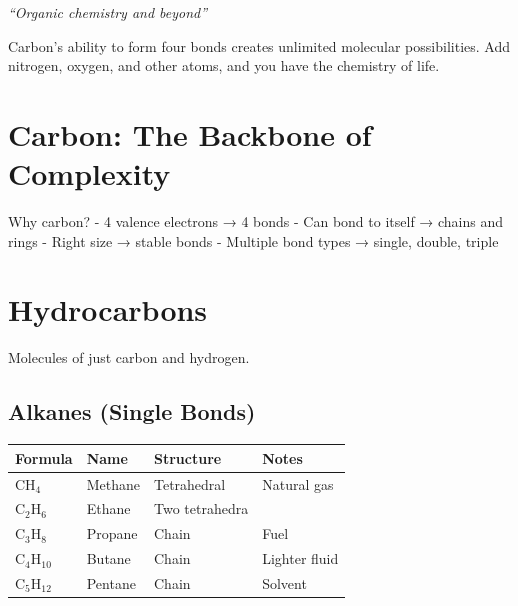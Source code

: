\documentclass[
  11pt,
  letterpaper,
  twoside,
  openright]{book}
\begin{document}
\emph{``Organic chemistry and beyond''}

\begin{tcolorbox}[enhanced jigsaw, coltitle=black, colbacktitle=quarto-callout-note-color!10!white, toprule=.15mm, colframe=quarto-callout-note-color-frame, arc=.35mm, opacityback=0, bottomtitle=1mm, toptitle=1mm, breakable, colback=white, titlerule=0mm, opacitybacktitle=0.6, title=\textcolor{quarto-callout-note-color}{\faInfo}\hspace{0.5em}{Key Revelation}, rightrule=.15mm, bottomrule=.15mm, leftrule=.75mm, left=2mm]

Carbon's ability to form four bonds creates unlimited molecular
possibilities. Add nitrogen, oxygen, and other atoms, and you have the
chemistry of life.

\end{tcolorbox}

\section{Carbon: The Backbone of
Complexity}\label{carbon-the-backbone-of-complexity}

Why carbon? - 4 valence electrons → 4 bonds - Can bond to itself →
chains and rings - Right size → stable bonds - Multiple bond types →
single, double, triple

\section{Hydrocarbons}\label{hydrocarbons}

Molecules of just carbon and hydrogen.

\subsection{Alkanes (Single Bonds)}\label{alkanes-single-bonds}

\begin{longtable}[]{@{}llll@{}}
\toprule\noalign{}
Formula & Name & Structure & Notes \\
\midrule\noalign{}
\endhead
\bottomrule\noalign{}
\endlastfoot
\(\text{CH}_4\) & Methane & Tetrahedral & Natural gas \\
\(\text{C}_2\text{H}_6\) & Ethane & Two tetrahedra & \\
\(\text{C}_3\text{H}_8\) & Propane & Chain & Fuel \\
\(\text{C}_4\text{H}_{10}\) & Butane & Chain & Lighter fluid \\
\(\text{C}_5\text{H}_{12}\) & Pentane & Chain & Solvent \\
\end{longtable}
\end{document}
